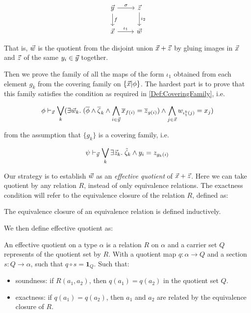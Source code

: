 \[
\begin{tikzcd}
 \vec{y}\ar[d,"f"]\ar[r,"\sigma"] & \vec{z}\ar[d,"\iota_2"]\\
 \vec{x}\ar[r,"\iota_1"] & \vec{w}
\end{tikzcd}
\]

That is, $\vec{w}$ is the quotient from the disjoint union $\vec{x} + \vec{z}$ by gluing images in $\vec{x}$ and $\vec{z}$ of the same $y_i\in \vec{y}$ together.


Then we prove the family of all the maps of the form $\iota_1$ obtained from each element $g_k$ from the covering family on $\{ \vec{x} | \phi \}$.
The hardest part is to prove that this family satisfies the condition as required in \ref{Def:CoveringFamily}, i.e.

\begin{equation}
\phi \vdash_{\vec{x}} \bigvee_k (\exists\vec{w}_k.\;(\overline{\phi}\land \overline{\zeta}_k \land\bigwedge_{i\in \vec{y}} \overline{x}_{f(i)} = \overline{z}_{g(i)}) \land \bigwedge_{j\in\vec{x}}w_{{\iota^k_1(j)}} = x_j )
\end{equation}

from the assumption that $\{g_k\}$ is a covering family, i.e.

\[\psi\vdash_{\vec{y}} \bigvee_k \exists \vec{z}_k.\; \tilde{\zeta}_k\land y_i = z_{g_k(i)}\]

  
Our strategy is to establish $\vec{w}$ as an \emph{effective quotient} of $\vec{x}+ \vec{z}$. 
Here we can take quotient by any relation $R$, instead of only equivalence relations. 
The exactness condition will refer to the equivalence closure of the relation $R$, defined as:

\begin{definition}
  The equivalence closure of an equivalence relation is defined inductively.
  \leanok
\end{definition}

We then define effective quotient as:

\begin{definition}
  \leanok
  An effective quotient on a type $\alpha$ is a relation $R$ on $\alpha$ and a carrier set $Q$ represents of the quotient
  set by $R$. With a quotient map $q:\alpha\to Q$ and a section $s:Q\to \alpha$, such that $q\circ s = \mathbf{1}_Q$. Such that:
  \begin{itemize}
    \item soundness: if $R(a_1,a_2)$, then $q(a_1) = q(a_2)$ in the quotient set $Q$.
    \item exactness: if $q(a_1) = q(a_2)$, then $a_1$ and $a_2$ are related by the equivalence closure of $R$.
  \end{itemize}

\end{definition}

